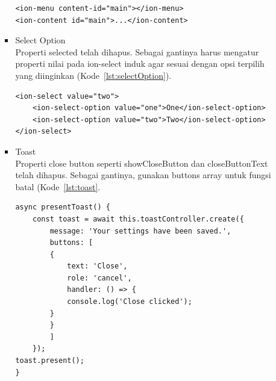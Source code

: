 \begin{enumerate}
\begin{itemize}
\begin{itemize}
\begin{lstlisting}[label={lst:menu}, caption=Kode Program untuk Menu]
<ion-menu content-id="main"></ion-menu>
<ion-content id="main">...</ion-content>
\end{lstlisting}

\newpage
			\item Select Option \\
			Properti selected telah dihapus. Sebagai gantinya harus mengatur properti nilai pada ion-select induk agar sesuai dengan opsi terpilih yang diinginkan (Kode~\ref{lst:selectOption}).
\begin{lstlisting}[label={lst:selectOption}, caption=Kode Program untuk Select Option]
<ion-select value="two">
	<ion-select-option value="one">One</ion-select-option>
	<ion-select-option value="two">Two</ion-select-option>
</ion-select>
\end{lstlisting}
			
			\item Toast \\
			Properti close button seperti showCloseButton dan closeButtonText telah dihapus. Sebagai gantinya, gunakan buttons array untuk fungsi batal (Kode~\ref{lst:toast}.

			
\begin{lstlisting}[label={lst:toast}, caption=Kode Program untuk Toast]
async presentToast() {
	const toast = await this.toastController.create({
		message: 'Your settings have been saved.',
		buttons: [	
		{
			text: 'Close',
			role: 'cancel',
			handler: () => {
			console.log('Close clicked');	
		}
		}
		]
	});
toast.present();
}
\end{lstlisting}
		\end{itemize}


\end{itemize}
\end{enumerate}
